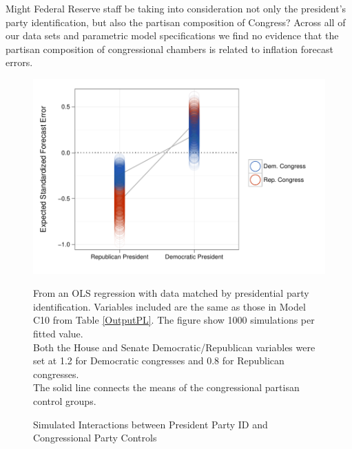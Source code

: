 \documentclass[a4paper]{article}\usepackage{graphicx, color}
\newenvironment{knitrout}{}{} %
\begin{document}
Might Federal Reserve staff be taking into consideration not only the president's party identification, but also the partisan composition of Congress?  Across all of our data sets and parametric model specifications we find no evidence that the partisan composition of congressional chambers is related to inflation forecast errors. 

\begin{figure}[t]
    \caption{Simulated Interactions between President Party ID and Congressional Party Controls}
    \label{InterPlot}
    \begin{center}

\begin{knitrout}
\color{fgcolor}\includegraphics[width=0.8\linewidth]{figure/InterPlot} 
\end{knitrout}


    \end{center}
    \begin{singlespace}
        {\scriptsize{From an OLS regression with data matched by presidential party identification. Variables included are the same as those in Model C10 from Table \ref{OutputPL}. The figure show 1000 simulations per fitted value. \\ Both the House and Senate Democratic/Republican variables were set at 1.2 for Democratic congresses and 0.8 for Republican congresses. \\ The solid line connects the means of the congressional partisan control groups.}}
    \end{singlespace}
\end{figure}
\end{document}

